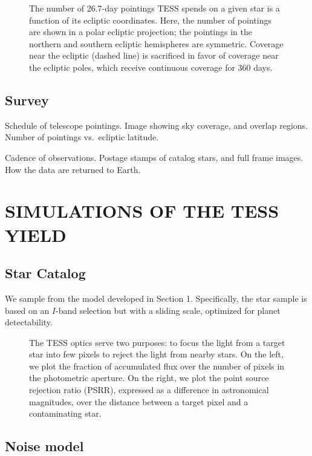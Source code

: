 \documentclass{emulateapj}
\begin{document}
\begin{figure}[ht]
\caption{The number of 26.7-day pointings TESS spends on a given star is a function of its ecliptic coordinates. Here, the number of pointings are shown in a polar ecliptic projection; the pointings in the northern and southern ecliptic hemispheres are symmetric. Coverage near the ecliptic (dashed line) is sacrificed in favor of coverage near the ecliptic poles, which receive continuous coverage for 360 days.}
\label{fig:npoint}
\end{figure}


\subsection{Survey} 

Schedule of telescope pointings. Image showing sky coverage, and
overlap regions. Number of pointings vs.\ ecliptic latitude.

Cadence of observations. Postage stamps of catalog stars, and full
frame images.  How the data are returned to Earth.

\section{SIMULATIONS OF THE TESS YIELD}
\label{sec:yield}
\subsection{Star Catalog}

We sample from the model developed in Section 1.  Specifically, the
star sample is based on an $I$-band selection but with a sliding
scale, optimized for planet detectability.

\begin{figure*}[ht]
\caption{The TESS optics serve two purposes: to focus the light from a target star into few pixels to reject the light from nearby stars. On the left, we plot the fraction of accumulated flux over the number of pixels in the photometric aperture. On the right, we plot the point source rejection ratio (PSRR), expressed as a difference in astronomical magnitudes, over the distance between a target pixel and a contaminating star.}
\end{figure*}

\subsection{Noise model}
\end{document}
